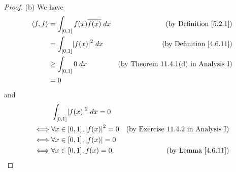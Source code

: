 \begin{proof}{(b)}
    We have
    \begin{align*}
        \inner*{f, f} & = \int_{[0, 1]} f(x) \overline{f(x)} \; dx & \text{(by Definition \ref{5.2.1})}          \\
                      & = \int_{[0, 1]} \abs*{f(x)}^2 \; dx        & \text{(by Definition \ref{4.6.11})}         \\
                      & \geq \int_{[0, 1]} 0 \; dx                 & \text{(by Theorem 11.4.1(d) in Analysis I)} \\
                      & = 0
    \end{align*}
    and
    \begin{align*}
             & \int_{[0, 1]} \abs*{f(x)}^2 \; dx = 0                                               \\
        \iff & \forall x \in [0, 1], \abs*{f(x)}^2 = 0 & \text{(by Exercise 11.4.2 in Analysis I)} \\
        \iff & \forall x \in [0, 1], \abs*{f(x)} = 0                                               \\
        \iff & \forall x \in [0, 1], f(x) = 0.         & \text{(by Lemma \ref{4.6.11})}
    \end{align*}
\end{proof}

